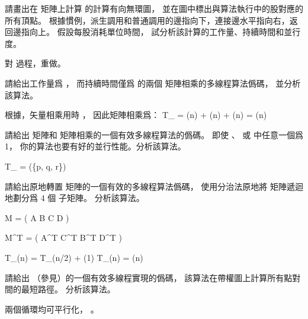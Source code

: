 \startsection[
  title={Multithreadedmatrix multiplication},
]

\startEXERCISE[exercise:27.2-1]
請畫出在  矩陣上計算  的計算有向無環圖，
並在圖中標出與算法執行中的股對應的所有頂點。
根據慣例，派生調用和普通調用的邊指向下，連接邊水平指向右，返回邊指向上。
假設每股消耗單位時間，
試分析該計算的工作量、持續時間和並行度。
\stopEXERCISE

\startANSWER
\externalfigure[output/e27_2_1-1]
\stopANSWER

\startEXERCISE
對  過程，重做。
\stopEXERCISE

\startANSWER
{}
\stopANSWER

\startEXERCISE
請給出工作量爲 ，
而持續時間僅爲  的兩個  矩陣相乘的多線程算法僞碼，
並分析該算法。
\stopEXERCISE

\startANSWER
根據，矢量相乘用時 ，
因此矩陣相乘爲：
\startformula
T_{\infty} = \Theta(\lg n) + \Theta(\lg n) + \Theta(\lg n) = \Theta(\lg n)
\stopformula
\stopANSWER

\startEXERCISE
請給出  矩陣和  矩陣相乘的一個有效多線程算法的僞碼。
即使 、  或  中任意一個爲 1，
你的算法也要有好的並行性能。分析該算法。
\stopEXERCISE

\startANSWER
\startformula
T_{\infty} = \Theta(\min\{\lg p, \lg q, \lg r\})
\stopformula
\stopANSWER

\startEXERCISE
請給出原地轉置  矩陣的一個有效的多線程算法僞碼，
使用分治法原地將  矩陣遞迴地劃分爲 4 個  子矩陣。
分析該算法。
\stopEXERCISE

\startANSWER
\startformula
M = \left(\startmatrix
\NC A \NC B \NR
\NC C \NC D \NR
\stopmatrix\right)
\stopformula

\startformula
M^T = \left(\startmatrix
\NC A^T \NC C^T \NR
\NC B^T \NC D^T \NR
\stopmatrix\right)
\stopformula

\startformula\startmathalignment
\NC T_{\infty}(n) \NC = T_{\infty}(n/2) + \Theta(1) \NR
\NC T_{\infty}(n) \NC = \Theta(\lg n) \NR
\stopmathalignment\stopformula
\stopANSWER

\startEXERCISE
請給出  （參見）的一個有效多線程實現的僞碼，
該算法在帶權圖上計算所有點對間的最短路徑。
分析該算法。
\stopEXERCISE

\startANSWER
兩個循環均可平行化， 。
\stopANSWER

\stopsection
